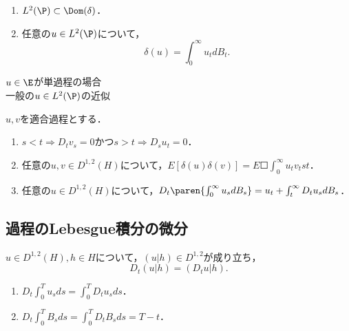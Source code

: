 \documentclass[uplatex,dvipdfmx]{jsreport}
\begin{document}
\begin{theorem}\mbox{}
    \begin{enumerate}
        \item $L^2(\P)\subset\Dom(\delta)$．
        \item 任意の$u\in L^2(\P)$について，
        \[\delta(u)=\int^\infty_0u_tdB_t.\]
    \end{enumerate}
\end{theorem}
\begin{Proof}\mbox{}
    \begin{description}
        \item[$u\in\E$が単過程の場合] 
        \item[一般の$u\in L^2(\P)$の近似] 
    \end{description}
\end{Proof}

\begin{proposition}
    $u,v$を適合過程とする．
    \begin{enumerate}
        \item $s<t\Rightarrow D_tv_s=0$かつ$s>t\Rightarrow D_su_t=0$．
        \item 任意の$u,v\in D^{1,2}(H)$について，$E[\delta(u)\delta(v)]=E\Square{\int^\infty_0u_tv_tst}$．
        \item 任意の${u\in D^{1,2}(H)}$について，$D_t\paren{\int^\infty_0u_sdB_s}=u_t+\int^\infty_tD_tu_sdB_s$．
    \end{enumerate}
\end{proposition}

\subsection{過程のLebesgue積分の微分}

\begin{proposition}[内積と微分の可換性]
    $u\in D^{1,2}(H),h\in H$について，$(u|h)\in D^{1,2}$が成り立ち，
    \[D_t(u|h)=(D_tu|h).\]
\end{proposition}

\begin{corollary}\mbox{}
    \begin{enumerate}
        \item $D_t\int^T_0u_sds=\int^T_0D_tu_sds$．
        \item $D_t\int^T_0B_sds=\int^T_0D_tB_sds=T-t$．
    \end{enumerate}
\end{corollary}
\end{document}

